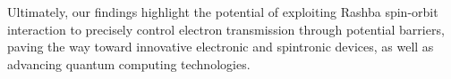 \documentclass[twocolumn, aps, prb, 10pt]{revtex4-2}
\begin{document}
    Ultimately, our findings highlight the potential of exploiting Rashba spin-orbit interaction to precisely control electron transmission through potential barriers, paving the way toward innovative electronic and spintronic devices, as well as advancing quantum computing technologies.

    \pagebreak


    
    
\end{document}
